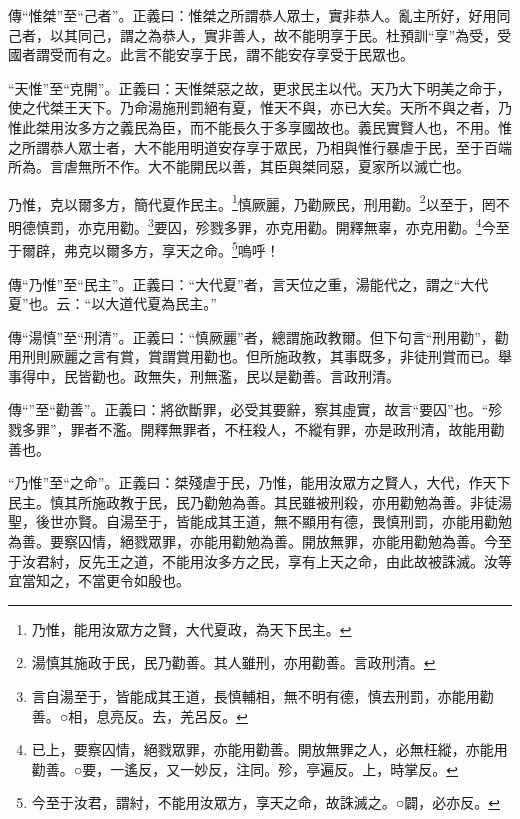{\noindent\zhuan{}\fzbyks 傳“惟桀”至“己者”。正義曰：惟桀之所謂恭人眾士，實非恭人。亂主所好，好用同己者，以其同己，謂之為恭人，實非善人，故不能明享于民。杜預訓“享”為受，受國者謂受而有之。此言不能安享于民，謂不能安存享受于民眾也。 \par}

{\noindent\shu{}\fzkt “天惟”至“克開”。正義曰：天惟桀惡之故，更求民主以代。天乃大下明美之命于，使之代桀王天下。乃命湯施刑罰絕有夏，惟天不與，亦已大矣。天所不與之者，乃惟此桀用汝多方之義民為臣，而不能長久于多享國故也。義民實賢人也，不用。惟之所謂恭人眾士者，大不能用明道安存享于眾民，乃相與惟行暴虐于民，至于百端所為。言虐無所不作。大不能開民以善，其臣與桀同惡，夏家所以滅亡也。 \par}

乃惟，克以爾多方，簡代夏作民主。\footnote{乃惟，能用汝眾方之賢，大代夏政，為天下民主。}慎厥麗，乃勸厥民，刑用勸。\footnote{湯慎其施政于民，民乃勸善。其人雖刑，亦用勸善。言政刑清。}以至于，罔不明德慎罰，亦克用勸。\footnote{言自湯至于，皆能成其王道，長慎輔相，無不明有德，慎去刑罰，亦能用勸善。○相，息亮反。去，羌呂反。}要囚，殄戮多罪，亦克用勸。開釋無辜，亦克用勸。\footnote{已上，要察囚情，絕戮眾罪，亦能用勸善。開放無罪之人，必無枉縱，亦能用勸善。○要，一遙反，又一妙反，注同。殄，亭遍反。上，時掌反。}今至于爾辟，弗克以爾多方，享天之命。\footnote{今至于汝君，謂紂，不能用汝眾方，享天之命，故誅滅之。○闢，必亦反。}嗚呼！


{\noindent\zhuan{}\fzbyks 傳“乃惟”至“民主”。正義曰：“大代夏”者，言天位之重，湯能代之，謂之“大代夏”也。云：“以大道代夏為民主。” \par}

{\noindent\zhuan{}\fzbyks 傳“湯慎”至“刑清”。正義曰：“慎厥麗”者，總謂施政教爾。但下句言“刑用勸”，勸用刑則厥麗之言有賞，賞謂賞用勸也。但所施政教，其事既多，非徒刑賞而已。舉事得中，民皆勸也。政無失，刑無濫，民以是勸善。言政刑清。 \par}

{\noindent\zhuan{}\fzbyks 傳“”至“勸善”。正義曰：將欲斷罪，必受其要辭，察其虛實，故言“要囚”也。“殄戮多罪”，罪者不濫。開釋無罪者，不枉殺人，不縱有罪，亦是政刑清，故能用勸善也。 \par}

{\noindent\shu{}\fzkt “乃惟”至“之命”。正義曰：桀殘虐于民，乃惟，能用汝眾方之賢人，大代，作天下民主。慎其所施政教于民，民乃勸勉為善。其民雖被刑殺，亦用勸勉為善。非徒湯聖，後世亦賢。自湯至于，皆能成其王道，無不顯用有德，畏慎刑罰，亦能用勸勉為善。要察囚情，絕戮眾罪，亦能用勸勉為善。開放無罪，亦能用勸勉為善。今至于汝君紂，反先王之道，不能用汝多方之民，享有上天之命，由此故被誅滅。汝等宜當知之，不當更令如殷也。 \par}

